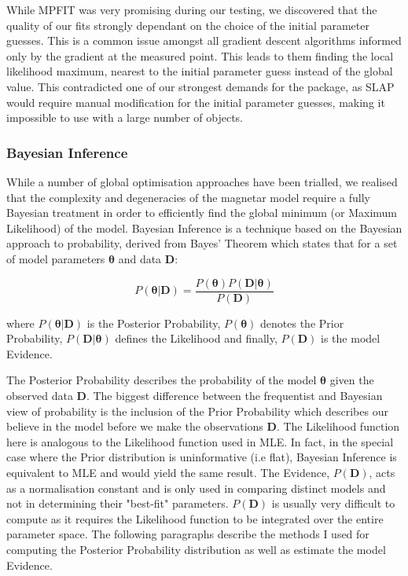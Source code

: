 While \textsc{MPFIT} was very promising during our testing, we discovered that the quality of our fits strongly dependant on the choice of the initial parameter guesses. This is a common issue amongst all gradient descent algorithms informed only by the gradient at the measured point. This leads to them finding the local likelihood maximum, nearest to the initial parameter guess instead of the global value. This contradicted one of our strongest demands for the package, as \textsc{SLAP} would require manual modification for the initial parameter guesses, making it impossible to use with a large number of objects.

\subsubsection{Bayesian Inference}
While a number of global optimisation approaches have been trialled, we realised that the complexity and degeneracies of the magnetar model require a fully Bayesian treatment in order to efficiently find the global minimum (or Maximum Likelihood) of the model. Bayesian Inference is a technique based on the Bayesian approach to probability, derived from Bayes' Theorem which states that for a set of model parameters $\mathbf{\theta}$ and data $\mathbf{D}$:

\begin{equation}
  P(\mathbf{\theta}|\mathbf{D}) = \frac{P(\mathbf{\theta}) P(\mathbf{D}|\mathbf{\theta})}{P(\mathbf{D})}
\end{equation}

\noindent where $P(\mathbf{\theta}|\mathbf{D})$ is the Posterior Probability, $P(\mathbf{\theta})$ denotes the Prior Probability, $P(\mathbf{D}|\mathbf{\theta})$ defines the Likelihood and finally, $P(\mathbf{D})$ is the model Evidence.

The Posterior Probability describes the probability of the model $\mathbf{\theta}$ given the observed data $\mathbf{D}$. The biggest difference between the frequentist and Bayesian view of probability is the inclusion of the Prior Probability which describes our believe in the model before we make the observations $\textbf{D}$. The Likelihood function here is analogous to the Likelihood function used in MLE. In fact, in the special case where the Prior distribution is uninformative (i.e flat), Bayesian Inference is equivalent to MLE and would yield the same result. The Evidence, $P(\mathbf{D})$, acts as a normalisation constant and is only used in comparing distinct models and not in determining their "best-fit" parameters. $P(\mathbf{D})$ is usually very difficult to compute as it requires the Likelihood function to be integrated over the entire parameter space. The following paragraphs describe the methods I used for computing the Posterior Probability distribution as well as estimate the model Evidence.

